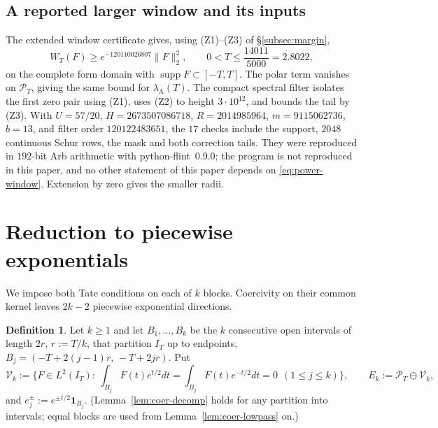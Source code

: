 \documentclass[10pt]{amsart}
\theoremstyle{definition}
\newtheorem{definition}[theorem]{Definition}
\theoremstyle{remark}
\newcommand{\supp}{\operatorname{supp}}
\newcommand{\PT}{\mathcal P_T}
\newcommand{\IT}{I_T}
\newcommand{\lamA}{\lambda_{\mathrm A}(T)}
\begin{document}
\subsection{A reported larger window and its inputs}\label{subsec:power-window}
The extended window certificate gives, using (Z1)--(Z3) of \S\ref{subsec:margin},
\begin{equation}\label{eq:power-window}
 W_T(F)\ge e^{-120110026807}\|F\|_2^2,
 \qquad 0<T\le\frac{14011}{5000}=2.8022,
\end{equation}
on the complete form domain with $\supp F\subset[-T,T]$.
The polar term vanishes on $\PT$, giving the same bound for $\lamA$.
The compact spectral filter isolates the first zero pair using (Z1),
uses (Z2) to height $3\cdot10^{12}$, and bounds the tail by (Z3).
With $U=57/20$, $H=2673507086718$, $R=2014985964$, $m=9115062736$,
$b=13$, and filter order $120122483651$, the $17$ checks include the
support, $2048$ continuous Schur rows, the mask and both correction tails.
They were reproduced in $192$-bit Arb arithmetic with python-flint~0.9.0; the program is not
reproduced in this paper, and no other statement of this paper depends on \eqref{eq:power-window}.
Extension by zero gives the smaller radii.

\section{Reduction to piecewise exponentials}\label{sec:coer}

We impose both Tate conditions on each of $k$ blocks. Coercivity on
their common kernel leaves $2k-2$ piecewise exponential directions.

\begin{definition}\label{def:coer-V}
Let $k\ge1$ and let $B_1,\dots,B_k$ be the $k$ consecutive open intervals of length $2r$,
$r:=T/k$, that partition $\IT$ up to endpoints, $B_j=(-T+2(j-1)r,\,-T+2jr)$. Put
\[
\mathcal V_k:=\Big\{F\in L^2(\IT):\ \int_{B_j}F(t)e^{t/2}dt=\int_{B_j}F(t)e^{-t/2}dt=0\ \ (1\le j\le k)\Big\},
\qquad E_k:=\PT\ominus\mathcal V_k ,
\]
and $e_j^\pm:=e^{\pm t/2}\mathbf 1_{B_j}$. (Lemma~\ref{lem:coer-decomp} holds for any partition into
intervals; equal blocks are used from Lemma~\ref{lem:coer-lowpass} on.)
\end{definition}
\end{document}
